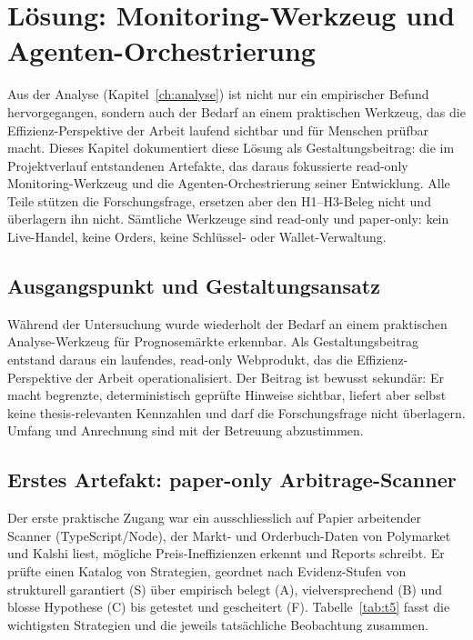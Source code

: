 \chapter{Lösung: Monitoring-Werkzeug und Agenten-Orchestrierung}
\label{ch:loesung}

Aus der Analyse (Kapitel~\ref{ch:analyse}) ist nicht nur ein empirischer Befund
hervorgegangen, sondern auch der Bedarf an einem praktischen Werkzeug, das die
Effizienz-Perspektive der Arbeit laufend sichtbar und für Menschen prüfbar macht.
Dieses Kapitel dokumentiert diese Lösung als Gestaltungsbeitrag: die im
Projektverlauf entstandenen Artefakte, das daraus fokussierte read-only
Monitoring-Werkzeug und die Agenten-Orchestrierung seiner Entwicklung. Alle Teile
stützen die Forschungsfrage, ersetzen aber den H1--H3-Beleg nicht und überlagern
ihn nicht. Sämtliche Werkzeuge sind read-only und paper-only: kein Live-Handel,
keine Orders, keine Schlüssel- oder Wallet-Verwaltung.

\section{Ausgangspunkt und Gestaltungsansatz}
\label{sec:loesung-ansatz}
Während der Untersuchung wurde wiederholt der Bedarf an einem praktischen
Analyse-Werkzeug für Prognosemärkte erkennbar. Als Gestaltungsbeitrag entstand
daraus ein laufendes, read-only Webprodukt, das die Effizienz-Perspektive der
Arbeit operationalisiert. Der Beitrag ist bewusst sekundär: Er macht begrenzte,
deterministisch geprüfte Hinweise sichtbar, liefert aber selbst keine
thesis-relevanten Kennzahlen und darf die Forschungsfrage nicht überlagern. Umfang
und Anrechnung sind mit der Betreuung abzustimmen.

\section{Erstes Artefakt: paper-only Arbitrage-Scanner}
\label{sec:loesung-arb}
Der erste praktische Zugang war ein ausschliesslich auf Papier arbeitender Scanner
(TypeScript/Node), der Markt- und Orderbuch-Daten von Polymarket und Kalshi liest,
mögliche Preis-Ineffizienzen erkennt und Reports schreibt. Er prüfte einen Katalog
von Strategien, geordnet nach Evidenz-Stufen von strukturell garantiert (S) über
empirisch belegt (A), vielversprechend (B) und blosse Hypothese (C) bis getestet
und gescheitert (F). Tabelle~\ref{tab:t5} fasst die wichtigsten Strategien und die
jeweils tatsächliche Beobachtung zusammen.

